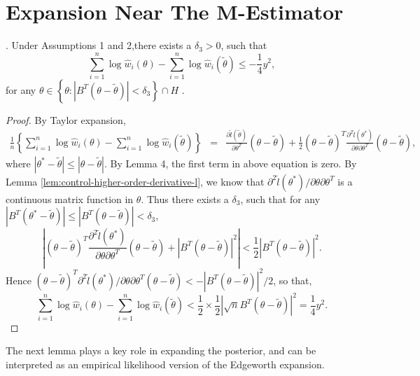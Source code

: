 \section{Expansion Near The M-Estimator}
\begin{lemma}
\label{lem:near-mean-2nd-order-bound-2}.  Under  Assumptions 1 and 2,there exists a $\delta_{3}>0$,
such that 
\[
\sum_{i=1}^{n}\log\hat{w}_{i}\left(\theta\right)-\sum_{i=1}^{n}\log\hat{w}_{i}\left(\tilde{\theta}\right)\le-\frac{1}{4}y^{2},
\]
for any $\theta\in\left\{ \theta:\left|B^T\left(\theta-\tilde{\theta}\right)\right|<\delta_{3}\right\} \cap H$
. \end{lemma}
\begin{proof}
By Taylor expansion, 
\begin{eqnarray*}
\frac{1}{n}\left\{ \sum_{i=1}^{n}\log\hat{w}_{i}\left(\theta\right)-\sum_{i=1}^{n}\log\hat{w}_{i}\left(\tilde{\theta}\right)\right\}  & = & \frac{\partial\tilde{l}\left(\tilde{\theta}\right)}{\partial\theta^T}\left(\theta-\tilde{\theta}\right)+\frac{1}{2}\left(\theta-\tilde{\theta}\right)^T\frac{\partial^{2}\tilde{l}\left(\theta^{*}\right)}{\partial\theta \partial\theta^T}\left(\theta-\tilde{\theta}\right),
\end{eqnarray*}
where $\left|\theta^{*}-\tilde{\theta}\right|\le\left|\theta-\tilde{\theta}\right|$.
By Lemma 4, the first term in above equation
is zero. By Lemma \ref{lem:control-higher-order-derivative-l}, we
know that ${\partial^{2}\tilde{l}\left(\theta^{*}\right)} / {\partial\theta \partial\theta^T}$
is a continuous matrix function in $\theta$. Thus there exists a $\delta_{3}$,
such that for any $\left|B^T \left(\theta^{*}-\tilde{\theta}\right)\right|\le\left|B^T\left(\theta-\tilde{\theta}\right)\right|<\delta_{3}$,
\[
\left|\left(\theta-\tilde{\theta}\right)^T\frac{\partial^{2}\tilde{l}\left(\theta^{*}\right)}{\partial\theta \partial\theta^T}\left(\theta-\tilde{\theta}\right)+\left|B^T\left(\theta-\tilde{\theta}\right)\right|^{2}\right|<\frac{1}{2}\left|B^T\left(\theta-\tilde{\theta}\right)\right|^{2}.
\]
Hence $\left(\theta-\tilde{\theta}\right)^T{\partial^{2}\tilde{l}\left(\theta^{*}\right)} / {\partial\theta \partial\theta^T}\left(\theta-\tilde{\theta}\right)<-\left|B^T\left(\theta-\tilde{\theta}\right)\right|^{2}/2$,
 so that, 
\[
\sum_{i=1}^{n}\log\hat{w}_{i}\left(\theta\right)-\sum_{i=1}^{n}\log\hat{w}_{i}\left(\tilde{\theta}\right)<\frac{1}{2}\times\frac{1}{2}\left|\sqrt{n}B^T\left(\theta-\tilde{\theta}\right)\right|^{2}=\frac{1}{4}y^{2}.
\]
\end{proof}
The next lemma plays a key role in expanding the posterior, and can be interpreted as an empirical likelihood version of the Edgeworth expansion. 
